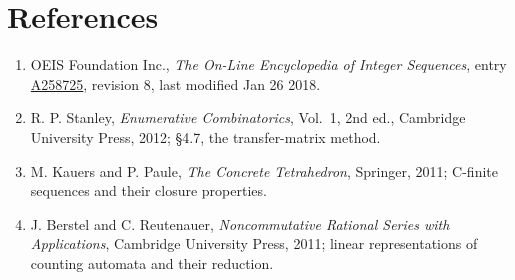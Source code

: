 \documentclass[11pt]{article}
\theoremstyle{definition}
\begin{document}
\section{References}

\begin{enumerate}

\item OEIS Foundation Inc., \emph{The On-Line Encyclopedia of Integer Sequences}, entry \href{https://oeis.org/A258725}{A258725}, revision 8, last modified Jan 26 2018.

\item R. P. Stanley, \emph{Enumerative Combinatorics}, Vol.~1, 2nd ed., Cambridge University Press, 2012; \S4.7, the transfer-matrix method.

\item M. Kauers and P. Paule, \emph{The Concrete Tetrahedron}, Springer, 2011; C-finite sequences and their closure properties.

\item J. Berstel and C. Reutenauer, \emph{Noncommutative Rational Series with Applications}, Cambridge University Press, 2011; linear representations of counting automata and their reduction.

\end{enumerate}
\end{document}
